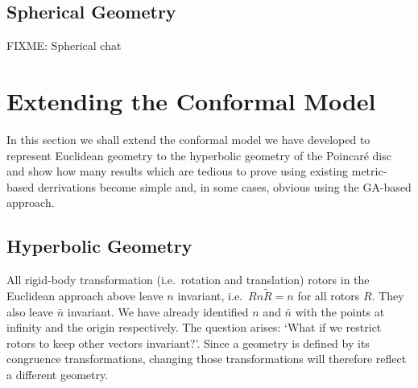 
\subsection{Spherical Geometry}

FIXME: Spherical chat

\section{Extending the Conformal Model}

In this section we shall extend the conformal model we have developed to
represent Euclidean geometry to the hyperbolic geometry of the Poincar\'e
disc and show how many results which are tedious to prove using existing
metric-based derrivations become simple and, in some cases, obvious using the
GA-based approach.

%
%
\subsection{Hyperbolic Geometry}

All rigid-body transformation (i.e.\ rotation and translation) rotors in 
the Euclidean approach above leave $n$ invariant, i.e.\ 
$Rn\tilde{R} = n$ for all rotors $R$. They also leave $\bar{n}$ invariant. We have
already identified $n$ and $\bar{n}$ with the points at infinity and the origin 
respectively. The question arises: `What if we restrict rotors to keep other
vectors invariant?'. Since a geometry is defined by its congruence transformations,
changing those transformations will therefore reflect a different geometry.

